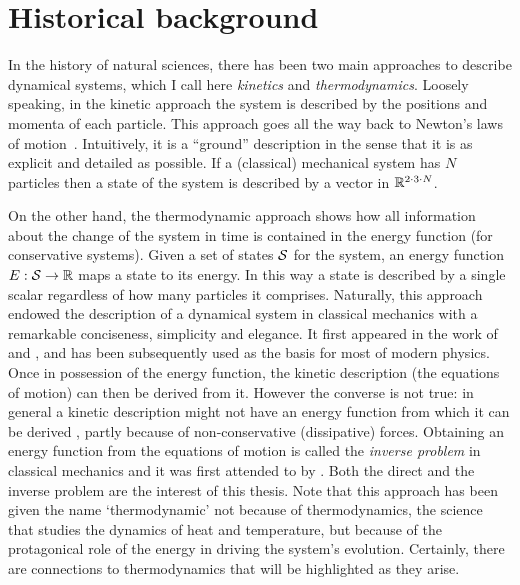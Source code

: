 % 
\section{Historical background}
In the history of natural sciences,
there has been two main approaches to describe dynamical systems,
which I call here
\emph{kinetics} and \emph{thermodynamics}.
Loosely speaking, in the kinetic approach the system is
described by the positions and momenta of each particle.
This approach goes all the way back to
Newton's laws of motion~\citep{newton}.
Intuitively, it is a ``ground'' description in the sense that
it is as explicit and detailed as possible.
If a (classical) mechanical system has $N$ particles
then a state of the system is described by
a vector in $\mathbb{R}^{2 \cdot 3 \cdot N}$.

On the other hand,
the thermodynamic approach shows how
all information about the change of the system in time
is contained in the energy function (for conservative systems).
Given a set of states $\mathcal{S}$ for the system,
an energy function $E: \mathcal{S} \to \mathbb{R}$ maps a state to its energy.
In this way a state is described by a single scalar
regardless of how many particles it comprises.
Naturally, this approach endowed the description of
a dynamical system in classical mechanics
with a remarkable conciseness, simplicity and elegance.
It first appeared in the work of
\citet{lagrange2} and \citet{hamilton},
and has been subsequently used as the basis for most of modern physics.
Once in possession of the energy function,
the kinetic description (\ie the equations of motion)
can then be derived from it.
However the converse is not true:
in general a kinetic description might not have an energy function
from which it can be derived \citep{santilli},
partly because of non-conservative (\eg dissipative) forces.
Obtaining an energy function from the equations of motion
is called the \emph{inverse problem} in classical mechanics
and it was first attended to by \citet{helmholtz}.
Both the direct and the inverse problem are the interest of this thesis.
Note that this approach has been given the name `thermodynamic'
not because of thermodynamics,
the science that studies the dynamics of heat and temperature,
but because of the protagonical role of the energy
in driving the system's evolution.
Certainly, there are connections to thermodynamics
that will be highlighted as they arise.

